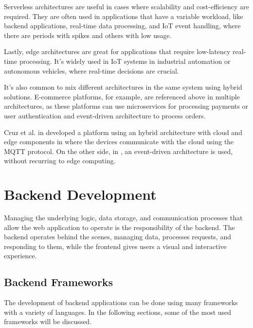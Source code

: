 Serverless architectures are useful in cases where scalability and cost-efficiency
are required. They are often used in applications that have a variable workload,
like backend applications, real-time data processing, and \gls{IoT} event handling, where
there are periods with spikes and others with low usage.

Lastly, edge architectures are great for applications that require low-latency
real-time processing. It's widely used in \gls{IoT} systems in industrial
automation or autonomous vehicles, where real-time decisions are crucial.

It's also common to mix different architectures in the same system using
hybrid solutions. E-commerce platforms, for example, are referenced above in
multiple architectures, as these platforms can use microservices for processing
payments or user authentication and event-driven architecture to process orders.

Cruz et al. in \cite{s22155866} developed a platform using an hybrid architecture
with cloud and edge components in where the devices communicate with
the cloud using the \gls{MQTT} protocol. On the other side, in \cite{lopez},
an event-driven architecture is used, without recurring to edge computing.

\section{Backend Development}
Managing the underlying logic, data storage, and communication processes that
allow the web application to operate is the responsibility of the backend.
The backend operates behind the scenes, managing data, processes requests, and
responding to them, while the frontend gives users a visual and interactive
experience.
\subsection{Backend Frameworks}
The development of backend applications can be done using many frameworks with
a variety of languages. In the following sections, some of the most used
frameworks will be discussed.
